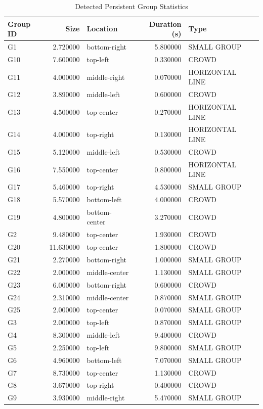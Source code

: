 \begin{table}
\caption{Detected Persistent Group Statistics}
\label{tab:group_statistics}
\begin{tabular}{lrlrl}
\toprule
Group ID & Size & Location & Duration (s) & Type \\
\midrule
G1 & 2.720000 & bottom-right & 5.800000 & SMALL GROUP \\
G10 & 7.600000 & top-left & 0.330000 & CROWD \\
G11 & 4.000000 & middle-right & 0.070000 & HORIZONTAL LINE \\
G12 & 3.890000 & middle-left & 0.600000 & CROWD \\
G13 & 4.500000 & top-center & 0.270000 & HORIZONTAL LINE \\
G14 & 4.000000 & top-right & 0.130000 & HORIZONTAL LINE \\
G15 & 5.120000 & middle-left & 0.530000 & CROWD \\
G16 & 7.550000 & top-center & 0.800000 & HORIZONTAL LINE \\
G17 & 5.460000 & top-right & 4.530000 & SMALL GROUP \\
G18 & 5.570000 & bottom-left & 4.000000 & CROWD \\
G19 & 4.800000 & bottom-center & 3.270000 & CROWD \\
G2 & 9.480000 & top-center & 1.930000 & CROWD \\
G20 & 11.630000 & top-center & 1.800000 & CROWD \\
G21 & 2.270000 & bottom-right & 1.000000 & SMALL GROUP \\
G22 & 2.000000 & middle-center & 1.130000 & SMALL GROUP \\
G23 & 6.000000 & bottom-right & 0.600000 & CROWD \\
G24 & 2.310000 & middle-center & 0.870000 & SMALL GROUP \\
G25 & 2.000000 & top-center & 0.070000 & SMALL GROUP \\
G3 & 2.000000 & top-left & 0.870000 & SMALL GROUP \\
G4 & 8.300000 & middle-left & 9.400000 & CROWD \\
G5 & 2.250000 & top-left & 9.800000 & SMALL GROUP \\
G6 & 4.960000 & bottom-left & 7.070000 & SMALL GROUP \\
G7 & 8.730000 & top-center & 1.130000 & CROWD \\
G8 & 3.670000 & top-right & 0.400000 & CROWD \\
G9 & 3.930000 & middle-right & 5.470000 & SMALL GROUP \\
\bottomrule
\end{tabular}
\end{table}
